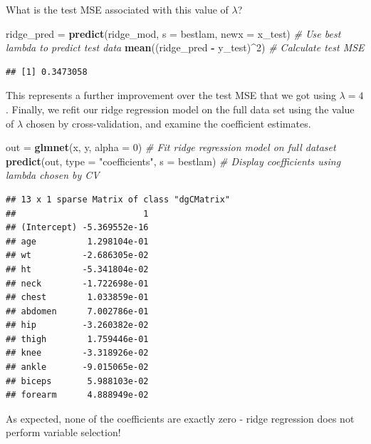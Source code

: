 \documentclass[]{article}
\newenvironment{Shaded}{\begin{snugshade}}{\end{snugshade}}
\newcommand{\KeywordTok}[1]{\textcolor[rgb]{0.13,0.29,0.53}{\textbf{#1}}}
\newcommand{\DataTypeTok}[1]{\textcolor[rgb]{0.13,0.29,0.53}{#1}}
\newcommand{\DecValTok}[1]{\textcolor[rgb]{0.00,0.00,0.81}{#1}}
\newcommand{\StringTok}[1]{\textcolor[rgb]{0.31,0.60,0.02}{#1}}
\newcommand{\CommentTok}[1]{\textcolor[rgb]{0.56,0.35,0.01}{\textit{#1}}}
\newcommand{\OperatorTok}[1]{\textcolor[rgb]{0.81,0.36,0.00}{\textbf{#1}}}
\newcommand{\NormalTok}[1]{#1}
\begin{document}
What is the test MSE associated with this value of \(\lambda\)?

\begin{Shaded}
\begin{Highlighting}[]
\NormalTok{ridge_pred =}\StringTok{ }\KeywordTok{predict}\NormalTok{(ridge_mod, }\DataTypeTok{s =}\NormalTok{ bestlam, }\DataTypeTok{newx =}\NormalTok{ x_test) }\CommentTok{# Use best lambda to predict test data}
\KeywordTok{mean}\NormalTok{((ridge_pred }\OperatorTok{-}\StringTok{ }\NormalTok{y_test)}\OperatorTok{^}\DecValTok{2}\NormalTok{) }\CommentTok{# Calculate test MSE}
\end{Highlighting}
\end{Shaded}

\begin{verbatim}
## [1] 0.3473058
\end{verbatim}

This represents a further improvement over the test MSE that we got
using \(\lambda = 4\). Finally, we refit our ridge regression model on
the full data set using the value of \(\lambda\) chosen by
cross-validation, and examine the coefficient estimates.

\begin{Shaded}
\begin{Highlighting}[]
\NormalTok{out =}\StringTok{ }\KeywordTok{glmnet}\NormalTok{(x, y, }\DataTypeTok{alpha =} \DecValTok{0}\NormalTok{) }\CommentTok{# Fit ridge regression model on full dataset}
\KeywordTok{predict}\NormalTok{(out, }\DataTypeTok{type =} \StringTok{"coefficients"}\NormalTok{, }\DataTypeTok{s =}\NormalTok{ bestlam) }\CommentTok{# Display coefficients using lambda chosen by CV}
\end{Highlighting}
\end{Shaded}

\begin{verbatim}
## 13 x 1 sparse Matrix of class "dgCMatrix"
##                         1
## (Intercept) -5.369552e-16
## age          1.298104e-01
## wt          -2.686305e-02
## ht          -5.341804e-02
## neck        -1.722698e-01
## chest        1.033859e-01
## abdomen      7.002786e-01
## hip         -3.260382e-02
## thigh        1.759446e-01
## knee        -3.318926e-02
## ankle       -9.015065e-02
## biceps       5.988103e-02
## forearm      4.888949e-02
\end{verbatim}

As expected, none of the coefficients are exactly zero - ridge
regression does not perform variable selection!
\end{document}
